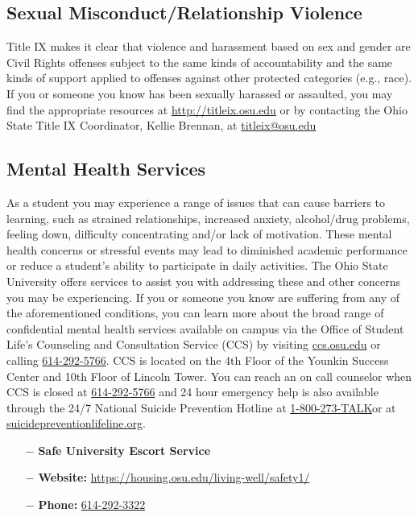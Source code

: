 \documentclass[12pt,letter,english]{report}
\providecommand{\tightlist}{%
      \setlength{\itemsep}{0pt}\setlength{\parskip}{0pt}%
}
\begin{document}
\subsection{Sexual Misconduct/Relationship Violence}

Title IX makes it clear that violence and harassment based on sex and gender are Civil Rights offenses subject to the same kinds of accountability and the same kinds of support applied to offenses against other protected categories (e.g., race). If you or someone you know has been sexually harassed or assaulted, you may find the appropriate resources at \href{http://titleix.osu.edu/}{http://titleix.osu.edu} or by contacting the Ohio State Title IX Coordinator, Kellie Brennan, at \href{mailto:titleix@osu.edu}{titleix@osu.edu}

\subsection{Mental Health Services}

As a student you may experience a range of issues that can cause barriers to learning, such as strained relationships, increased anxiety, alcohol/drug problems, feeling down, difficulty concentrating and/or lack of motivation. These mental health concerns or stressful events may lead to diminished academic performance or reduce a student's ability to participate in daily activities. The Ohio State University offers services to assist you with addressing these and other concerns you may be experiencing. If you or someone you know are suffering from any of the aforementioned conditions, you can learn more about the broad range of confidential mental health services available on campus via the Office of Student Life's Counseling and Consultation Service (CCS) by visiting \href{http://ccs.osu.edu/}{ccs.osu.edu} or calling \href{tel:614­2925766}{614­-292-­5766}. CCS is located on the 4th Floor of the Younkin Success Center and 10th Floor of Lincoln Tower. You can reach an on call counselor when CCS is closed at \href{tel:614­292-5766}{614­-292-­5766} and 24 hour emergency help is also available through the 24/7 National Suicide Prevention Hotline at \href{tel:­800­2738255}{1-­800­-273-TALK}or at \href{http://suicidepreventionlifeline.org/}{suicidepreventionlifeline.org}.


\begin{itemize}
      \tightlist
      \item[$-$] \textbf{Safe University Escort Service}
      \item[$-$] \textbf{Website:} \href{https://housing.osu.edu/living-well/safety1/}{{https://housing.osu.edu/living-well/safety1/}}
      \item[$-$] \textbf{Phone:} \href{tel:6142923322}{614-292-3322}
\end{itemize}
\end{document}

